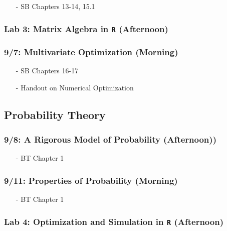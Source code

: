 \documentclass[11pt,letterpaper]{article}
\numberwithin{equation}{section}
\begin{document}
\begin{itemize}
\item[-] SB Chapters 13-14, 15.1
\end{itemize}


\subsubsection*{Lab 3: Matrix Algebra in {\tt R} (Afternoon)}


\subsubsection*{9/7: Multivariate Optimization (Morning)}


\begin{itemize}
\item[-] SB Chapters 16-17
\item[-] Handout on Numerical Optimization
\end{itemize}





\subsection*{Probability Theory}


\subsubsection*{9/8: A Rigorous Model of Probability (Afternoon))}
\begin{itemize}
\item[-] BT Chapter 1
\end{itemize}





\subsubsection*{9/11: Properties of Probability (Morning)}

\begin{itemize}
\item[-] BT Chapter 1
\end{itemize}


\subsubsection*{Lab 4: Optimization and Simulation in {\tt R} (Afternoon)}
\end{document}

